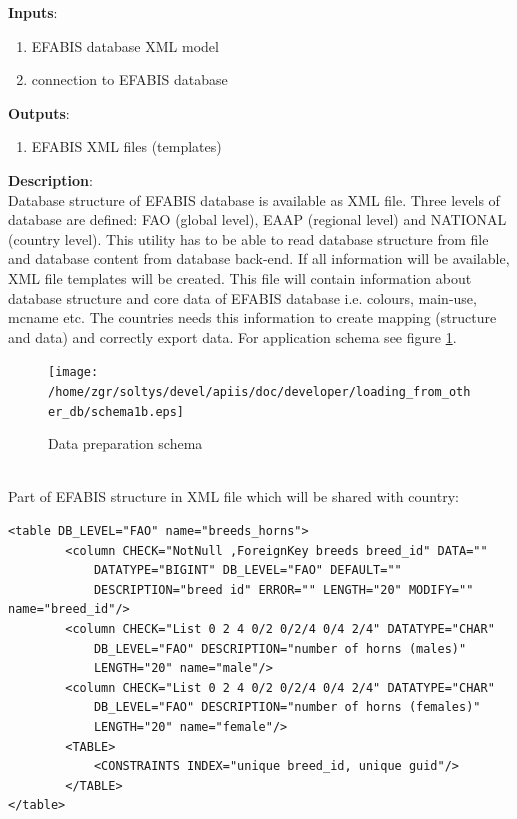 \textbf{Inputs}:
\begin{enumerate}
\item EFABIS database XML model
\item connection to EFABIS database
\end{enumerate}
\textbf{Outputs}:
\begin{enumerate}
\item EFABIS XML files (templates)
\end{enumerate}
\textbf{Description}:\\
Database structure of EFABIS database is available as XML file. Three levels of database are defined: FAO (global level), EAAP (regional level) and NATIONAL (country level). This utility has to be able to read database structure from file and database content from database back-end. If all information will be available, XML file templates will be created. This file will contain information about database structure and core data of EFABIS database i.e. colours, main-use, mcname etc. The countries needs this information to create mapping (structure and data) and correctly export data.
 For application schema see figure \ref{fig:schema1}.\\
\begin{figure}[h]
\begin{center}
   \texttt{[image: /home/zgr/soltys/devel/apiis/doc/developer/loading\_from\_other\_db/schema1b.eps]}
   \caption{Data preparation schema}
   \label{fig:schema1}
\end{center}
\end{figure}
\\Part of EFABIS structure in XML file which will be shared with country:\\
\scriptsize {
\begin{verbatim}
<table DB_LEVEL="FAO" name="breeds_horns">
        <column CHECK="NotNull ,ForeignKey breeds breed_id" DATA=""
            DATATYPE="BIGINT" DB_LEVEL="FAO" DEFAULT=""
            DESCRIPTION="breed id" ERROR="" LENGTH="20" MODIFY="" name="breed_id"/>
        <column CHECK="List 0 2 4 0/2 0/2/4 0/4 2/4" DATATYPE="CHAR"
            DB_LEVEL="FAO" DESCRIPTION="number of horns (males)"
            LENGTH="20" name="male"/>
        <column CHECK="List 0 2 4 0/2 0/2/4 0/4 2/4" DATATYPE="CHAR"
            DB_LEVEL="FAO" DESCRIPTION="number of horns (females)"
            LENGTH="20" name="female"/>
        <TABLE>
            <CONSTRAINTS INDEX="unique breed_id, unique guid"/>
        </TABLE>
</table>

\end{verbatim}}
\normalsize
